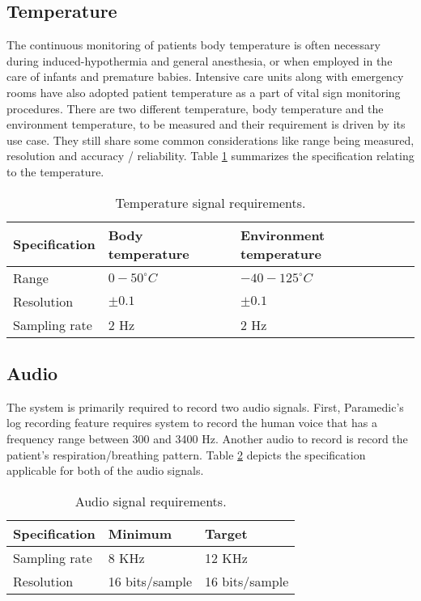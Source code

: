 \subsection{Temperature}

The continuous monitoring of patients body temperature is often
necessary during induced-hypothermia and general anesthesia, or when
employed in the care of infants and premature babies. Intensive care
units along with emergency rooms have also adopted patient
temperature as a part of vital sign monitoring procedures. There are
two different temperature, body temperature and the environment
temperature, to be measured and their requirement is driven by its
use case. They still share some common considerations like range
being measured, resolution and accuracy / reliability. Table
\ref{table:tmp} summarizes the specification relating to the
temperature. 

\begin{table}[h]
	\centering
	\begin{tabular}{|l|l|l|}
		\hline
		Specification & Body temperature & Environment temperature \\
		\hline
		Range & $0-50 ^{\circ}C$ & $-40-125 ^{\circ}C$ \\
		Resolution & $\pm 0.1$ & $\pm 0.1$\\
		Sampling rate & 2 Hz & 2 Hz \\
		\hline
	\end{tabular}
	\caption{Temperature signal requirements.}
	\label{table:tmp}
\end{table}

\subsection{Audio}
The system is primarily required to record two audio signals. First, Paramedic's log recording feature requires system to record the human voice that has a frequency range between 300 and 3400 Hz. Another audio to record is record the patient's respiration/breathing pattern. Table \ref{table:aud} depicts the specification applicable for both of the audio signals. 

\begin{table}[h]
	\centering
	\begin{tabular}{|l|l|l|}
		\hline
		Specification & Minimum & Target \\
		\hline
		Sampling rate &  8 KHz & 12 KHz \\
		Resolution & 16 bits/sample & 16 bits/sample \\
		\hline
	\end{tabular}
	\caption{Audio signal requirements.}
	\label{table:aud}
\end{table}
